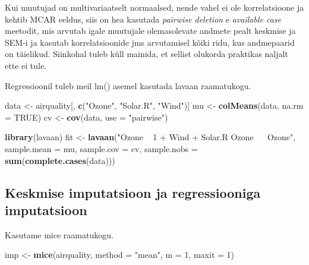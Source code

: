 \documentclass[]{book}
\newenvironment{Shaded}{\begin{snugshade}}{\end{snugshade}}
\newcommand{\KeywordTok}[1]{\textcolor[rgb]{0.13,0.29,0.53}{\textbf{#1}}}
\newcommand{\DataTypeTok}[1]{\textcolor[rgb]{0.13,0.29,0.53}{#1}}
\newcommand{\DecValTok}[1]{\textcolor[rgb]{0.00,0.00,0.81}{#1}}
\newcommand{\StringTok}[1]{\textcolor[rgb]{0.31,0.60,0.02}{#1}}
\newcommand{\OtherTok}[1]{\textcolor[rgb]{0.56,0.35,0.01}{#1}}
\newcommand{\NormalTok}[1]{#1}
\begin{document}
Kui muutujad on multivariaatselt normaalsed, nende vahel ei ole
korrelatsioone ja kehtib MCAR eeldus, siis on hea kasutada
\emph{pairwise deletion} e \emph{available case} meetodit, mis arvutab
igale muutujale olemasolevate andmete pealt keskmise ja SEM-i ja kasutab
korrelatsioonide jms arvutamisel kõiki ridu, kus andmepaarid on
täielikud. Siinkohal tuleb küll mainida, et sellist olukorda praktikas
naljalt ette ei tule.

Regressioonil tuleb meil lm() asemel kasutada lavaan raamatukogu.

\begin{Shaded}
\begin{Highlighting}[]
\NormalTok{data <-}\StringTok{ }\NormalTok{airquality[, }\KeywordTok{c}\NormalTok{(}\StringTok{"Ozone"}\NormalTok{, }\StringTok{"Solar.R"}\NormalTok{, }\StringTok{"Wind"}\NormalTok{)]}
\NormalTok{mu <-}\StringTok{ }\KeywordTok{colMeans}\NormalTok{(data, }\DataTypeTok{na.rm =} \OtherTok{TRUE}\NormalTok{)}
\NormalTok{cv <-}\StringTok{ }\KeywordTok{cov}\NormalTok{(data, }\DataTypeTok{use =} \StringTok{"pairwise"}\NormalTok{)}

\KeywordTok{library}\NormalTok{(lavaan)}
\NormalTok{fit <-}\StringTok{ }\KeywordTok{lavaan}\NormalTok{(}\StringTok{"Ozone ~ 1 + Wind + Solar.R}
\StringTok{              Ozone ~~ Ozone"}\NormalTok{,}
             \DataTypeTok{sample.mean =}\NormalTok{ mu, }\DataTypeTok{sample.cov =}\NormalTok{ cv,}
             \DataTypeTok{sample.nobs =} \KeywordTok{sum}\NormalTok{(}\KeywordTok{complete.cases}\NormalTok{(data)))}
\end{Highlighting}
\end{Shaded}

\subsection{Keskmise imputatsioon ja regressiooniga
imputatsioon}\label{keskmise-imputatsioon-ja-regressiooniga-imputatsioon}

Kasutame mice raamatukogu.

\begin{Shaded}
\begin{Highlighting}[]
\NormalTok{imp <-}\StringTok{ }\KeywordTok{mice}\NormalTok{(airquality, }\DataTypeTok{method =} \StringTok{"mean"}\NormalTok{, }\DataTypeTok{m =} \DecValTok{1}\NormalTok{, }\DataTypeTok{maxit =} \DecValTok{1}\NormalTok{)}
\end{Highlighting}
\end{Shaded}
\end{document}
